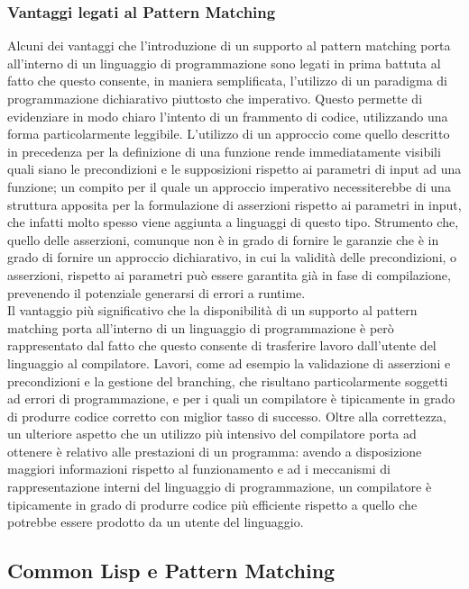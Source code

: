 \subsubsection{Vantaggi legati al Pattern Matching}

Alcuni dei vantaggi che l'introduzione di un supporto al pattern matching porta
all’interno di un linguaggio di programmazione sono legati in prima battuta al
fatto che questo consente, in maniera semplificata, l’utilizzo di un paradigma
di programmazione dichiarativo piuttosto che imperativo. Questo permette di
evidenziare in modo chiaro l’intento di un frammento di codice, utilizzando una
forma particolarmente leggibile. L’utilizzo di un approccio come quello
descritto in precedenza per la definizione di una funzione rende immediatamente
visibili quali siano le precondizioni e le supposizioni rispetto ai parametri di
input ad una funzione; un compito per il quale un approccio imperativo
necessiterebbe di una struttura apposita per la formulazione di asserzioni
rispetto ai parametri in input, che infatti molto spesso viene aggiunta a
linguaggi di questo tipo. Strumento che, quello delle asserzioni, comunque non è
in grado di fornire le garanzie che è in grado di fornire un approccio
dichiarativo, in cui la validità delle precondizioni, o asserzioni, rispetto ai
parametri può essere garantita già in fase di compilazione, prevenendo il
potenziale generarsi di errori a runtime.\\

Il vantaggio più significativo che la disponibilità di un supporto al pattern
matching porta all’interno di un linguaggio di programmazione è però
rappresentato dal fatto che questo consente di trasferire lavoro dall’utente del
linguaggio al compilatore. Lavori, come ad esempio la validazione di asserzioni
e precondizioni e la gestione del branching, che risultano particolarmente
soggetti ad errori di programmazione, e per i quali un compilatore è tipicamente
in grado di produrre codice corretto con miglior tasso di successo. Oltre alla
correttezza, un ulteriore aspetto che un utilizzo più intensivo del compilatore
porta ad ottenere è relativo alle prestazioni di un programma: avendo a
disposizione maggiori informazioni rispetto al funzionamento e ad i meccanismi
di rappresentazione interni del linguaggio di programmazione, un compilatore è
tipicamente in grado di produrre codice più efficiente rispetto a quello che
potrebbe essere prodotto da un utente del linguaggio.\\

\subsection{Common Lisp e Pattern Matching}

